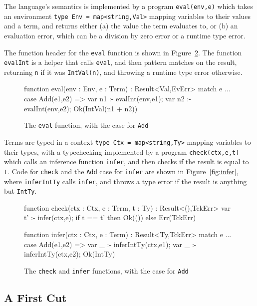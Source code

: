 \documentclass[sigplan,review,screen,anonymous]{acmart}
\begin{document}
The language's semantics is implemented by a program \texttt{eval(env,e)} which takes an environment \texttt{type
Env = map<string,Val>} mapping variables to their values and a term, and returns
either (a) the value the term evaluates to, or (b) an evaluation error, which can be a
division by zero error or a runtime type error.

The function header for the \texttt{eval} function is shown in Figure~\ref{fig:eval}.
The function \texttt{evalInt} is a helper that calls \texttt{eval}, and then pattern matches on the result,
returning \texttt{n} if it was \texttt{IntVal(n)}, and throwing a runtime type error otherwise.

\begin{figure}
\begin{dafny}
function eval(env : Env, e : Term) : Result<Val,EvErr>
{
  match e {
    ...
    case Add(e1,e2) =>
      var n1 :- evalInt(env,e1);
      var n2 :- evalInt(env,e2);
      Ok(IntVal(n1 + n2))
  }
}
  \end{dafny}
  \caption{The \texttt{eval} function, with the case for \texttt{Add}}
  \label{fig:eval}
\end{figure}


Terms are typed in a context \texttt{type Ctx = map<string,Ty>} mapping variables to their types,
with a typechecking implemented by a program \texttt{check(ctx,e,t)} which calls an inference function \texttt{infer}, and then checks if the result is equal to \texttt{t}.
Code for \texttt{check} and the \texttt{Add} case for \texttt{infer} are shown in Figure~\ref{fig:infer}, where
\texttt{inferIntTy} calls \texttt{infer}, and throws a type error if the result
is anything but \texttt{IntTy}.

\begin{figure}
\begin{dafny}
function check(ctx : Ctx, e : Term, t : Ty) : Result<(),TckErr> {
  var t' :- infer(ctx,e);
  if t == t' then Ok(()) else Err(TckErr)
}

function infer(ctx : Ctx, e : Term) : Result<Ty,TckErr> {
  match e {
    ...
    case Add(e1,e2) =>
      var _ :- inferIntTy(ctx,e1);
      var _ :- inferIntTy(ctx,e2);
      Ok(IntTy)
    }
  }
\end{dafny}
\caption{The \texttt{check} and \texttt{infer} functions, with the case for \texttt{Add}}
\label{fig:eval}
\end{figure}



\subsection*{A First Cut}
\end{document}
